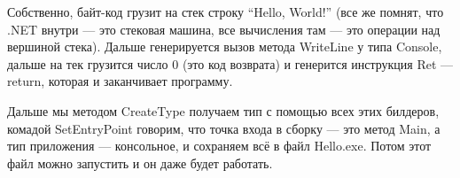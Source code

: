 \documentclass{../../text-style}
\begin{document}
Собственно, байт-код грузит на стек строку ``Hello, World!'' (все же помнят, что .NET внутри --- это стековая машина, все вычисления там --- это операции над вершиной стека). Дальше генерируется вызов метода WriteLine у типа Console, дальше на тек грузится число 0 (это код возврата) и генерится инструкция Ret --- return, которая и заканчивает программу. 

Дальше мы методом CreateType получаем тип с помощью всех этих билдеров, комадой SetEntryPoint говорим, что точка входа в сборку --- это метод Main, а тип приложения --- консольное, и сохраняем всё в файл Hello.exe. Потом этот файл можно запустить и он даже будет работать.
\end{document}
